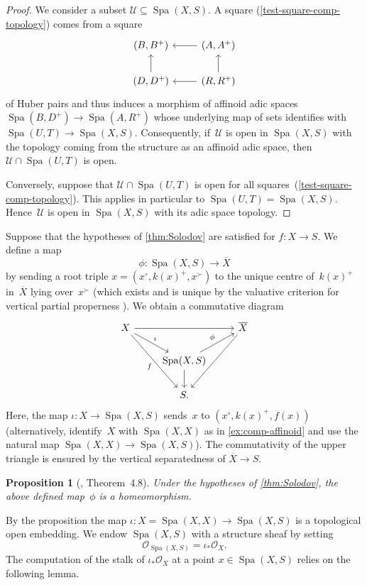 \documentclass[a4paper,twoside,11pt,reqno]{amsart}
\newcommand{\cO}{{\mathcal O}}
\newcommand{\cU}{{\mathcal U}}
\newcommand{\la}{\longrightarrow}
\DeclareMathOperator{\Spa}{Spa}
\newcommand{\ov}[1]{\overline{#1}}
\newtheorem{prop}[thm]{Proposition}
\theoremstyle{definition}
\numberwithin{equation}{subsection}
\begin{document}
\begin{proof}
    We consider a subset $\cU \subseteq \Spa(X,S)$.
    A square (\ref{test-square-comp-topology}) comes from a square
    \[
        \begin{tikzcd}
            (B,B^+)         & (A,A^+) \ar[l]    \\
            (D,D^+) \ar[u]  & (R,R^+) \ar[l] \ar[u]
        \end{tikzcd}
    \]
    of Huber pairs and thus induces a morphism of affinoid adic spaces $\Spa(B,D^+) \to \Spa(A,R^+)$ whose underlying map of sets identifies with $\Spa(U,T) \to \Spa(X,S)$.
    Consequently, if~$\cU$ is open in $\Spa(X,S)$ with the topology coming from the structure as an affinoid adic space, then $\cU \cap \Spa(U,T)$ is open.

    Conversely, suppose that $\cU \cap \Spa(U,T)$ is open for all squares~(\ref{test-square-comp-topology}).
    This applies in particular to $\Spa(U,T) = \Spa(X,S)$.
    Hence~$\cU$ is open in $\Spa(X,S)$ with its adic space topology.
\end{proof}

Suppose that the hypotheses of \cref{thm:Solodov} are satisfied for $f \colon X \to S$.
We define a map
\[
    \phi \colon \Spa(X,S) \la \ov X
\]
by sending a root triple $x = (x^\circ,k(x)^+,x^\succ)$ to the unique centre of~$k(x)^+$ in~$\ov X$ lying over~$x^\succ$ (which exists and is unique by the valuative criterion for vertical partial properness \cite{Bauer:valuative-criteria}).
We obtain a commutative diagram
\[
 \begin{tikzcd}
     X  \ar[rr] \ar[dr,"\iota"]  \ar[ddr,"f"']   &           & \ov X \ar[ddl]    \\
     & \Spa(X,S) \ar[d]  \ar[ur,"\phi"] \\
     & S.
 \end{tikzcd}
\]
Here, the map $\iota \colon X \to \Spa(X,S)$ sends~$x$ to $(x^\circ,k(x)^+,f(x))$ (alternatively, identify~$X$ with $\Spa(X,X)$ as in \cref{ex:comp-affinoid} and use the natural map $\Spa(X,X) \to \Spa(X,S)$).
The commutativity of the upper triangle is ensured by the vertical separatedness of $\ov X \to S$.


\begin{prop}[\cite{Solodov-vertical-compactification}, Theorem~4.8] \label{prop:comp-homeo}
    Under the hypotheses of \cref{thm:Solodov}, the above defined map~$\phi$ is a homeomorphism.
\end{prop}

By the proposition the map
$\iota \colon X = \Spa(X,X) \longrightarrow \Spa(X,S)$ is a topological open embedding.
We endow $\Spa(X,S)$ with a structure sheaf by setting 
\[
\cO_{\Spa(X,S)} = \iota_* \cO_X.
\]
The computation of the stalk of $\iota_*\cO_X$ at a point $x \in \Spa(X,S)$ relies on the following lemma.
\end{document}
